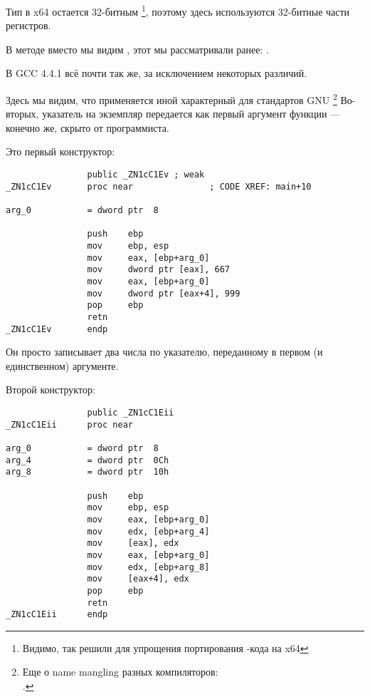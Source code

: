 

Тип \Tint в x64 остается 32-битным
\footnote{Видимо, так решили для упрощения портирования \CCpp{}-кода на x64}, 
поэтому здесь используются 32-битные части регистров.

В методе  вместо \RET мы видим , этот  мы рассматривали ранее: .


В GCC 4.4.1 всё почти так же, за исключением некоторых различий.



Здесь мы видим, что применяется иной  характерный для стандартов GNU
\footnote{Еще о name mangling разных компиляторов:\\
\InSqBrackets{\AgnerFogCC}.}
Во-вторых, указатель на экземпляр передается как первый аргумент функции --- конечно же, скрыто от программиста.

Это первый конструктор:

\begin{lstlisting}
                public _ZN1cC1Ev ; weak
_ZN1cC1Ev       proc near               ; CODE XREF: main+10

arg_0           = dword ptr  8

                push    ebp
                mov     ebp, esp
                mov     eax, [ebp+arg_0]
                mov     dword ptr [eax], 667
                mov     eax, [ebp+arg_0]
                mov     dword ptr [eax+4], 999
                pop     ebp
                retn
_ZN1cC1Ev       endp
\end{lstlisting}

Он просто записывает два числа по указателю, переданному в первом (и единственном) аргументе.

Второй конструктор:

\begin{lstlisting}
                public _ZN1cC1Eii
_ZN1cC1Eii      proc near

arg_0           = dword ptr  8
arg_4           = dword ptr  0Ch
arg_8           = dword ptr  10h

                push    ebp
                mov     ebp, esp
                mov     eax, [ebp+arg_0]
                mov     edx, [ebp+arg_4]
                mov     [eax], edx
                mov     eax, [ebp+arg_0]
                mov     edx, [ebp+arg_8]
                mov     [eax+4], edx
                pop     ebp
                retn
_ZN1cC1Eii      endp
\end{lstlisting}

